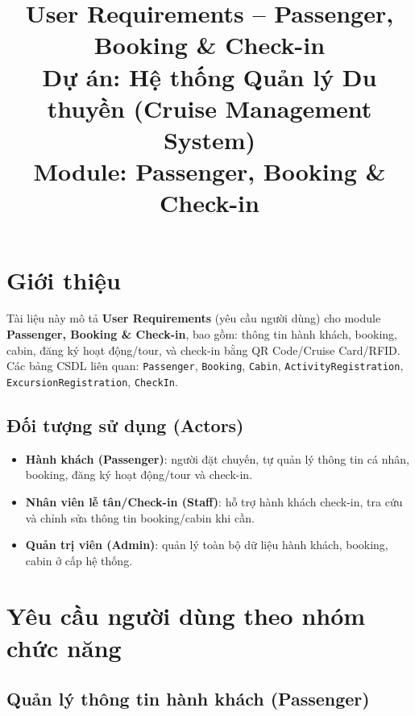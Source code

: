 \documentclass[a4paper,11pt]{article}
\title{\textbf{User Requirements -- Passenger, Booking \& Check-in}\\[4pt]
\large Dự án: Hệ thống Quản lý Du thuyền (Cruise Management System)\\
\normalsize Module: Passenger, Booking \& Check-in}
\author{}
\date{}
\begin{document}
\maketitle
\vspace{-1.5cm}
\tableofcontents
\vspace{0.5cm}

\section{Giới thiệu}

Tài liệu này mô tả \textbf{User Requirements} (yêu cầu người dùng) cho module \textbf{Passenger, Booking \& Check-in}, bao gồm: thông tin hành khách, booking, cabin, đăng ký hoạt động/tour, và check-in bằng QR Code/Cruise Card/RFID. Các bảng CSDL liên quan: \texttt{Passenger}, \texttt{Booking}, \texttt{Cabin}, \texttt{ActivityRegistration}, \texttt{ExcursionRegistration}, \texttt{CheckIn}.

\subsection{Đối tượng sử dụng (Actors)}

\begin{itemize}[leftmargin=1.2cm]
  \item \textbf{Hành khách (Passenger)}: người đặt chuyến, tự quản lý thông tin cá nhân, booking, đăng ký hoạt động/tour và check-in.
  \item \textbf{Nhân viên lễ tân/Check-in (Staff)}: hỗ trợ hành khách check-in, tra cứu và chỉnh sửa thông tin booking/cabin khi cần.
  \item \textbf{Quản trị viên (Admin)}: quản lý toàn bộ dữ liệu hành khách, booking, cabin ở cấp hệ thống.
\end{itemize}

\section{Yêu cầu người dùng theo nhóm chức năng}

\subsection{Quản lý thông tin hành khách (Passenger)}
\end{document}
